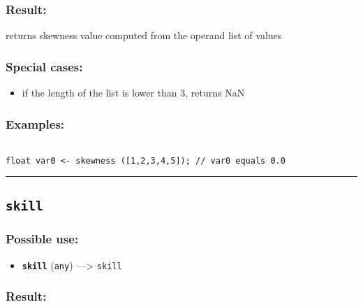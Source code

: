\documentclass[]{book}
\providecommand{\tightlist}{%
  \setlength{\itemsep}{0pt}\setlength{\parskip}{0pt}}
\theoremstyle{definition}
\theoremstyle{definition}
\theoremstyle{definition}
\theoremstyle{remark}
\begin{document}
\subsubsection{Result:}\label{result-466}

returns skewness value computed from the operand list of values

\subsubsection{Special cases:}\label{special-cases-123}

\begin{itemize}
\tightlist
\item
  if the length of the list is lower than 3, returns NaN
\end{itemize}

\subsubsection{Examples:}\label{examples-337}

\begin{verbatim}
 
float var0 <- skewness ([1,2,3,4,5]); // var0 equals 0.0
\end{verbatim}

\begin{center}\rule{0.5\linewidth}{\linethickness}\end{center}

\subsection{\texorpdfstring{\texttt{skill}}{skill}}\label{skill}

\subsubsection{Possible use:}\label{possible-use-483}

\begin{itemize}
\tightlist
\item
  \textbf{\texttt{skill}} (\texttt{any}) ---\textgreater{}
  \texttt{skill}
\end{itemize}

\subsubsection{Result:}\label{result-467}
\end{document}
